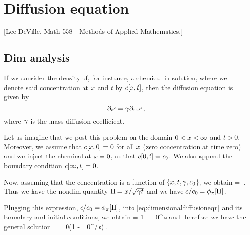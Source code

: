 \section{Diffusion equation}
%
\newcommand{\krcoeff}{\gamma} %


[Lee DeVille. Math 558 - Methods of Applied Mathematics.]


\subsection{Dim analysis}
If we consider the density of, for instance, a chemical in solution, where we denote said concentration at $x$ and $t$ by $c\!\left[{x, t}\right]$, then the diffusion equation is given by
\begin{equation}\label{eq:dimensionaldiffusioneqn}
\partial_{t}c = \gamma\partial_{xx}c\,,
\end{equation}
where $\gamma$ is the mass diffusion coefficient.

Let us imagine that we post this problem on the domain ${0}<{x}<{\infty}$ %
and $t > 0$. Moreover, we assume that $c\!\left[{x, 0}\right] = 0$ for all $x$ (zero concentration at time zero) and we inject the chemical at $x = 0$, so that $c\!\left[{0, t}\right] = c_0$. We also append the boundary condition $c\!\left[{\infty, t}\right] = 0$.

Now, assuming that the concentration is a function of $\left\lbrace{x, t, \gamma, c_0}\right\rbrace$, we obtain
\beq
{} = \kdimf{}\,.
\eeq
Thus we have the nondim quantity $\Pi = x/\sqrt{\gamma t}$ and we have $c/c_0 = \phi_{\pi}\!\left[{\Pi}\right]$.

Plugging this expression, $c/c_0 = \phi_{\pi}\!\left[{\Pi}\right]$, into \cref{eq:dimensionaldiffusioneqn} and its boundary and initial conditions, we obtain
\beq
\kdimf\vat{\kdim} = 1 - \int_0^\kdim \exp{}\,\dx s
\eeq
and therefore we have the general solution
\beq
\conc{} = \conc_0\left(1 - \int_0^{\lpos/}\exp{}\,\dx s\right)\,.
\eeq


